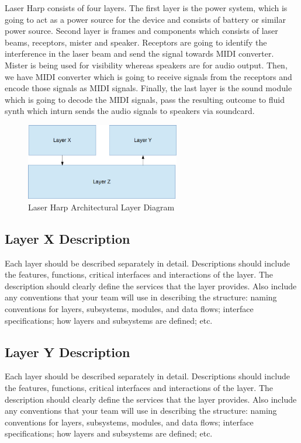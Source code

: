 Laser Harp consists of four layers. The first layer is the power system, which is going to act as a power source for the device and consists of battery or similar power source. Second layer is frames and components which consists of laser beams, receptors, mister and speaker. Receptors are going to identify the interference in the laser beam and send the signal towards MIDI converter. Mister is being used for visibility whereas speakers are for audio output. Then, we have MIDI converter which is going to receive signals from the receptors and encode those signals as MIDI signals. Finally, the last layer is the sound module which is going to decode the MIDI signals, pass the resulting outcome to fluid synth which inturn sends the audio signals to speakers via soundcard. 

\begin{figure}[h!]
	\centering
 	\includegraphics[width=0.60\textwidth]{images/layers}
 \caption{Laser Harp Architectural Layer Diagram}
\end{figure}

\subsection{Layer X Description}
Each layer should be described separately in detail. Descriptions should include the features, functions, critical interfaces and interactions of the layer. The description should clearly define the services that the layer provides. Also include any conventions that your team will use in describing the structure: naming conventions for layers, subsystems, modules, and data flows; interface specifications; how layers and subsystems are defined; etc. 

\subsection{Layer Y Description}
Each layer should be described separately in detail. Descriptions should include the features, functions, critical interfaces and interactions of the layer. The description should clearly define the services that the layer provides. Also include any conventions that your team will use in describing the structure: naming conventions for layers, subsystems, modules, and data flows; interface specifications; how layers and subsystems are defined; etc. 

